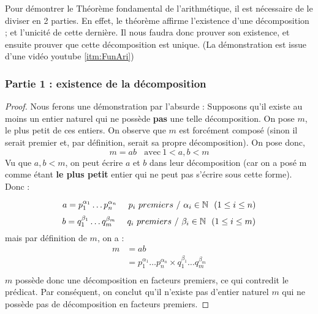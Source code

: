 Pour démontrer le Théorème fondamental de l'arithmétique, il est nécessaire de le diviser en 2 parties. \newline
En effet, le théorème affirme l'existence d'une décomposition ; et l'unicité de cette dernière. \newline
Il nous faudra donc prouver son existence, et ensuite prouver que cette décomposition est unique. \newline
(La démonstration est issue d'une vidéo youtube \ref{itm:FunAri})

\subsubsection{Partie 1 : existence de la décomposition}

\begin{proof}
Nous ferons une démonstration par l'absurde : \newline
Supposons qu'il existe au moins un entier naturel qui ne possède \textbf{pas} une telle décomposition.\newline
On pose $m$, le plus petit de ces entiers. \newline
On observe que $m$ est forcément composé (sinon il serait premier et, par définition, serait sa propre décomposition). \newline
\newline
On pose donc, \newline
$$ m = ab \ \ \ \ \text{avec} \ 1 < a,b < m$$ 
Vu que $a,b < m$, on peut écrire $a$ et $b$ dans leur décomposition (car on a posé m comme étant \textbf{le plus petit} entier qui ne peut pas s'écrire sous cette forme). \newline
Donc :

\begin{equation*} \label{equ:a}
    a = p_1^{\alpha_1} \ldots p_n^{\alpha_n} \ \ \ \ p_i \ premiers \ / \ \alpha_i \in \mathbb{N} \ \ (1 \leq i \leq n)
\end{equation*}
\begin{equation*} \label{equ:b}
    b = q_1^{\beta_1} \ldots q_m^{\beta_m} \ \ \ \ q_i \ premiers \ / \ \beta_i \in \ens{N} \ \ (1 \leq i \leq m)
\end{equation*}
\newline
mais par définition de $m$, on a :
\begin{align*}
    m & = ab \\
      & = p_1^{\alpha_1} \ldots p_n^{\alpha_n} \times q_1^{\beta_1} \ldots q_m^{\beta_m} \\
\end{align*}
$m$ possède donc une décomposition en facteurs premiers, ce qui contredit le prédicat. \newline
Par conséquent, on conclut qu'il n'existe pas d'entier naturel $m$ qui ne possède pas de décomposition en facteurs premiers.
\end{proof}

